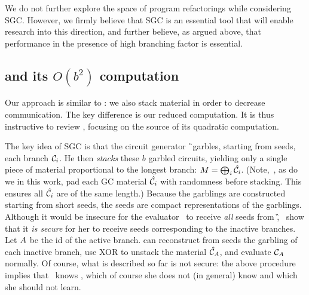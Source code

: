 We do not further explore the space of program refactorings while
considering SGC.
However, we firmly believe that SGC is an essential tool that will
enable research into this direction, and further believe, as argued
above, that performance in the presence of high branching factor is
essential.




\subsection{\HK and its $O(b^2)$ computation}
\label{sec:bsquaredcost}

Our approach is similar to \HK: we also stack material in
order to decrease communication.
The key difference is our reduced computation.
It is thus instructive to review \HK,
focusing on the source of its quadratic computation.

The key idea of SGC is that the circuit generator \G\ garbles,
starting from seeds, each branch $\mathcal C_i$.
He then \emph{stacks} these $b$ garbled circuits, yielding only a
single piece of material proportional to the longest branch: $M =
\bigoplus_i \hat{\mathcal C}_i$. (Note,~\HK, as do we in this work,  pad each GC material $\hat{\mathcal C}_i$ with randomness before stacking.  This ensures all $\hat{\mathcal C}_i$ are of the same length.)
Because the garblings are constructed starting from short seeds, the
seeds are compact representations of the garblings.
%
Although it would be insecure for the evaluator \E\ to receive
\emph{all} seeds from \G, \HK\ show that it \emph{is secure} for her
to receive seeds corresponding to the inactive branches.
Let $A$ be the id of the active branch.
\E can reconstruct from seeds the garbling of each inactive branch, use XOR to unstack
the material $\hat{\mathcal C}_{A}$, and evaluate $\mathcal C_{A}$ normally.
%
Of course, what is described so far is not secure: the above procedure
implies that \E\ knows \aid, which of course she does not (in general)
know and which she should not learn.


